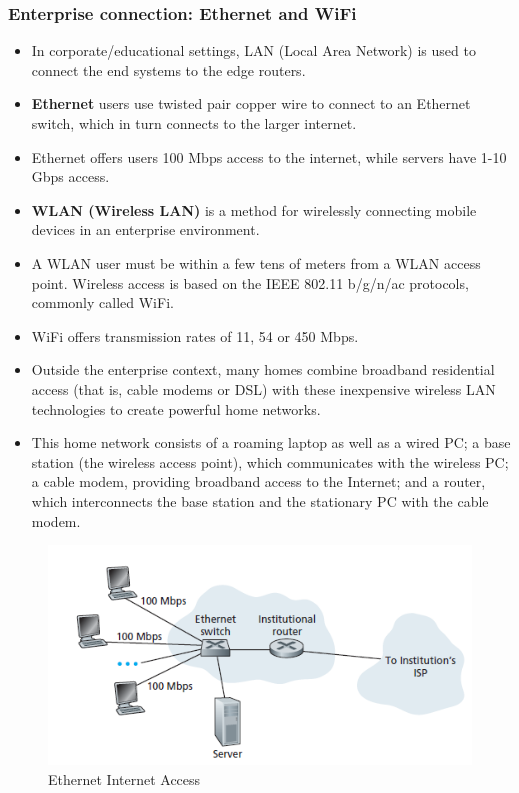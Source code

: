 \documentclass{article}
\theoremstyle{plain}
\theoremstyle{definition}
\begin{document}
\subsubsection{Enterprise connection: Ethernet and WiFi}

\begin{itemize}
    \item In corporate/educational settings, LAN (Local Area Network) is used to connect the end systems to the edge routers. 
    
    \item \textbf{Ethernet} users use twisted pair copper wire to connect to an Ethernet switch, which in turn connects to the larger internet. 
    
    \item Ethernet offers users 100 Mbps access to the internet, while servers have 1-10 Gbps access.
    
    \item\textbf{WLAN (Wireless LAN)} is a method for wirelessly connecting mobile devices in an enterprise environment. 
    
    \item A WLAN user must be within a few tens of meters from a WLAN access point. Wireless access is based on the IEEE 802.11 b/g/n/ac protocols, commonly called WiFi.
    
    \item WiFi offers transmission rates of 11, 54 or 450 Mbps.
    
    \item Outside the enterprise context, many homes combine broadband residential access (that is, cable modems or DSL) with these inexpensive wireless LAN technologies to create powerful home networks. 
    
    \item This home network consists of a roaming laptop as well as a wired PC; a base station (the wireless access point), which communicates with the wireless PC; a cable modem, providing broadband access to the Internet; and a router, which interconnects the base station and the stationary PC with the cable modem.
\end{itemize}

\begin{figure}[h]
    \centering
    \includegraphics{cn5.png}
    \caption{Ethernet Internet Access}
    \label{fig:my_label_5}
\end{figure}
\end{document}
